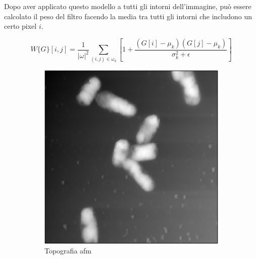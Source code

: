 \documentclass[../main.tex]{subfiles}
\begin{document}
Dopo aver applicato questo modello a tutti gli intorni dell'immagine, può essere calcolato il peso del filtro facendo la media tra tutti gli intorni che includono un certo pixel $i$.

\begin{equation}
	W\{G\}[i,j] = \frac{1}{|\omega|^2} \sum_{(i,j)\in\omega_k} \left[1+\frac{(G[i]-\mu_k)(G[j]-\mu_k)}{\sigma_k^2+\epsilon}\right]
\end{equation}

\begin{figure}[ht]
	\centering
	\begin{subfigure}{0.32\linewidth}
		\includegraphics[keepaspectratio, width=\linewidth]{images/entero_z.png}
		\caption{Topografia \acrshort{afm}}
	\end{subfigure}
	\begin{subfigure}{0.32\linewidth}

\end{subfigure}
\end{figure}
\end{document}

